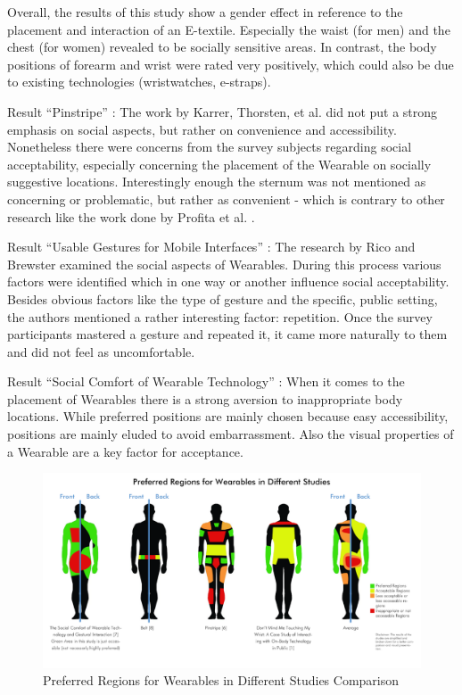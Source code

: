 \documentclass{sigchi}
\begin{document}
Overall, the results of this study show a gender effect in reference to the placement and interaction of an E-textile. Especially the waist (for men) and the chest (for women) revealed to be socially sensitive areas. In contrast, the body positions of forearm and wrist were rated very positively, which could also be due to existing technologies (wristwatches, e-straps).

Result “Pinstripe” \cite{pinstripe} : The work by Karrer, Thorsten, et al. did not put a strong emphasis on social aspects, but rather on convenience and accessibility. Nonetheless there were concerns from the survey subjects regarding social acceptability, especially concerning the placement of the Wearable on socially suggestive locations. Interestingly enough the sternum was not mentioned as concerning or problematic, but rather as convenient - which is contrary to other research like the work done by Profita et al. \cite{touch-wrist}.

Result “Usable Gestures for Mobile Interfaces” \cite{usable-gesture}: The research by Rico and Brewster examined the social aspects of Wearables. During this process various factors were identified which in one way or another influence social acceptability. Besides obvious factors like the type of gesture and the specific, public setting, the authors mentioned a rather interesting factor: repetition. Once the survey participants mastered a gesture and repeated it, it came more naturally to them and did not feel as uncomfortable.

Result “Social Comfort of Wearable Technology” \cite{social-comfort} : When it comes to the placement of Wearables there is a strong aversion to inappropriate body locations. While preferred positions are mainly chosen because easy accessibility, positions are mainly eluded to avoid embarrassment. Also the visual properties of a Wearable are a key factor for acceptance.

\begin{figure}[t]
  \includegraphics[width=\textwidth]{body-areas.png}
  \caption{Preferred Regions for Wearables in Different Studies Comparison
  \protect\cite{touch-wrist,pinstripe,social-comfort,belt,simpleskin}}
 \label{fig:body}
\end{figure}
\end{document}
